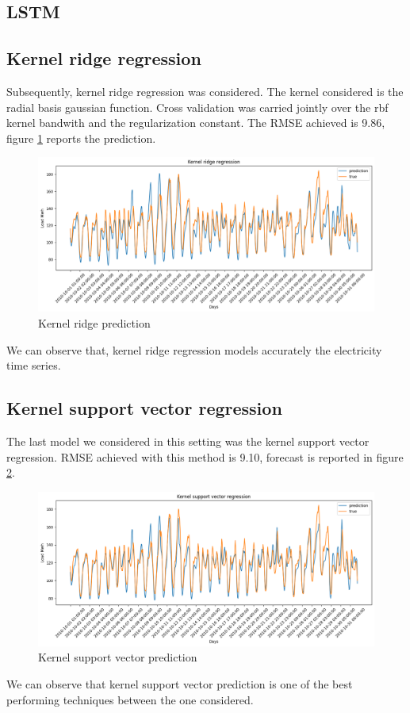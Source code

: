 \subsection{LSTM}

\subsection{Kernel ridge regression}
Subsequently, kernel ridge regression was considered. The kernel considered is the radial basis gaussian function.
Cross validation was carried jointly over the rbf kernel bandwith and the regularization constant.
The RMSE achieved is 9.86, figure \ref{fig:krnridge_price} reports the prediction.
\begin{figure}[!h]
    \includegraphics[width=\textwidth]{images/krnridge_price.png}
    \caption{Kernel ridge prediction}
    \label{fig:krnridge_price}
\end{figure}
We can observe that, kernel ridge regression models accurately the electricity time series.

\subsection{Kernel support vector regression}
The last model we considered in this setting was the kernel support vector regression.
RMSE achieved with this method is 9.10, forecast is reported in figure \ref{fig:krnsvr_price}.

\begin{figure}[!h]
    \includegraphics[width=\textwidth]{images/krnsvr_price.png}
    \caption{Kernel support vector prediction}
    \label{fig:krnsvr_price}
\end{figure}
We can observe that kernel support vector prediction is one of the best performing techniques between the one considered.


